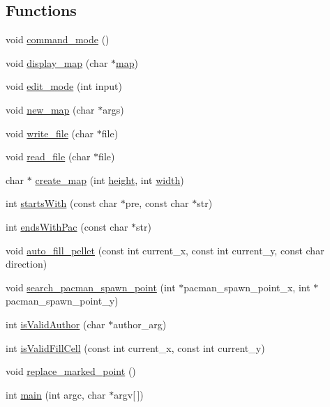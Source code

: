 \subsection*{Functions}
\begin{DoxyCompactItemize}
\item 
void \hyperlink{pacman-level-editor_8c_af892ff919e1c7850c0bd85827b9b648e}{command\-\_\-mode} ()
\item 
void \hyperlink{pacman-level-editor_8c_a77a5d2c2bbebb2204a994de0fc9e066d}{display\-\_\-map} (char $\ast$\hyperlink{pacman-level-editor_8c_a7b00b1bfd666e26484471bd17a74eaa9}{map})
\item 
void \hyperlink{pacman-level-editor_8c_aac01ba2c86cce30701b994bbfbd7e34a}{edit\-\_\-mode} (int input)
\item 
void \hyperlink{pacman-level-editor_8c_a87ec0b28c1d954f4b3192a1fba87130e}{new\-\_\-map} (char $\ast$args)
\item 
void \hyperlink{pacman-level-editor_8c_aaa90b13ddc12479556f96bdaf7cc04a5}{write\-\_\-file} (char $\ast$file)
\item 
void \hyperlink{pacman-level-editor_8c_ae8f3b08f62235bb7c36c368900757640}{read\-\_\-file} (char $\ast$file)
\item 
char $\ast$ \hyperlink{pacman-level-editor_8c_a8a62b1ef65d0697d60b3b762c9cf0799}{create\-\_\-map} (int \hyperlink{pacman-level-editor_8c_ad12fc34ce789bce6c8a05d8a17138534}{height}, int \hyperlink{pacman-level-editor_8c_a2474a5474cbff19523a51eb1de01cda4}{width})
\item 
int \hyperlink{pacman-level-editor_8c_afe756d85f40bd74c8ea6c8722ce012fb}{starts\-With} (const char $\ast$pre, const char $\ast$str)
\item 
int \hyperlink{pacman-level-editor_8c_ad1ba67de662f1a1791ca1cc3a05c402e}{ends\-With\-Pac} (const char $\ast$str)
\item 
void \hyperlink{pacman-level-editor_8c_a0e89020536a88fc330cd9e4aa35799b0}{auto\-\_\-fill\-\_\-pellet} (const int current\-\_\-x, const int current\-\_\-y, const char direction)
\item 
void \hyperlink{pacman-level-editor_8c_aa7287a91b4e306dacc3c9a5b8eb6c3e2}{search\-\_\-pacman\-\_\-spawn\-\_\-point} (int $\ast$pacman\-\_\-spawn\-\_\-point\-\_\-x, int $\ast$pacman\-\_\-spawn\-\_\-point\-\_\-y)
\item 
int \hyperlink{pacman-level-editor_8c_a78839797ab5993e64cbcd43e56e83819}{is\-Valid\-Author} (char $\ast$author\-\_\-arg)
\item 
int \hyperlink{pacman-level-editor_8c_a8b8c0e479a095829ab925c906e493de5}{is\-Valid\-Fill\-Cell} (const int current\-\_\-x, const int current\-\_\-y)
\item 
void \hyperlink{pacman-level-editor_8c_a7f12ac9d3ab2b706a5411ecf8d0d1ea2}{replace\-\_\-marked\-\_\-point} ()
\item 
int \hyperlink{pacman-level-editor_8c_a0ddf1224851353fc92bfbff6f499fa97}{main} (int argc, char $\ast$argv\mbox{[}$\,$\mbox{]})
\end{DoxyCompactItemize}
